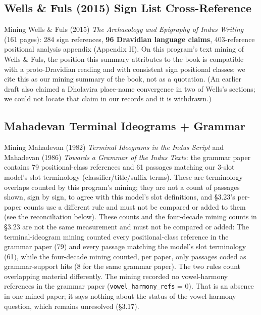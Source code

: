 \documentclass[11pt]{article}
\begin{document}
\subsection{Wells \& Fuls (2015) Sign List Cross-Reference }\label{wells-2015-sign-list-cross-reference-phase-157}

Mining Wells \& Fuls (2015) \emph{The Archaeology and Epigraphy of Indus
Writing} (161 pages): 284 sign references, \textbf{96 Dravidian language
claims}, 403-reference positional analysis appendix (Appendix II). On this program's text mining of Wells \& Fuls, the position this summary attributes to the book is compatible with a proto-Dravidian reading and with consistent sign positional classes; we cite this as our mining summary of the book, not as a quotation. (An earlier draft also claimed a Dholavira place-name convergence in two of Wells's sections; we could not locate that claim in our records and it is withdrawn.)

\subsection{Mahadevan Terminal Ideograms + Grammar
}\label{mahadevan-terminal-ideograms-grammar-phase-158}

Mining Mahadevan (1982) \emph{Terminal Ideograms in the Indus Script}
and Mahadevan (1986) \emph{Towards a Grammar of the Indus Texts}: the grammar paper contains 79 positional-class references and 61 passages matching our 3-slot model's slot terminology (classifier/title/suffix terms). These are terminology overlaps counted by this program's mining; they are not a count of passages shown, sign by sign, to agree with this model's slot definitions, and §3.23's per-paper counts use a different rule and must not be compared or added to them (see the reconciliation below). These counts and the four-decade mining counts in §3.23 are not the same measurement and must not be compared or added: The terminal-ideogram mining counted every positional-class reference in the grammar paper (79) and every passage matching the model's slot terminology (61), while the four-decade mining counted, per paper, only passages coded as grammar-support hits (8 for the same grammar paper). The two rules count overlapping material differently. The mining recorded no vowel-harmony references in the grammar paper (\texttt{vowel\_harmony\_refs} = 0). That is an absence in one mined paper; it says nothing about the status of the vowel-harmony question, which remains unresolved (§3.17).
\end{document}

